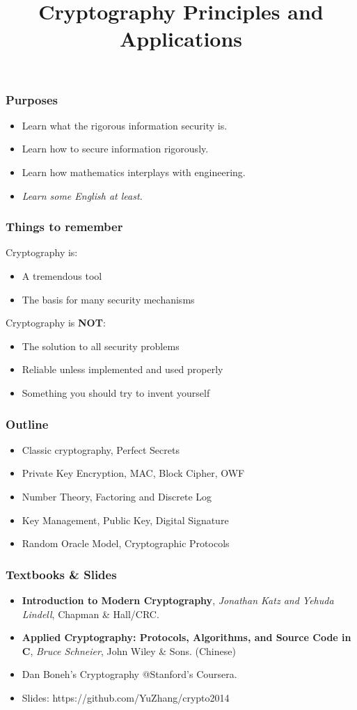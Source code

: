 

\title{Cryptography Principles and Applications}


\maketitle
\begin{frame}\frametitle{Purposes}
\begin{itemize}
\item Learn what the rigorous information security is.
\item Learn how to secure information rigorously.
\item Learn how mathematics interplays with engineering.
\item \emph{Learn some English at least.}
\end{itemize}
\end{frame}
\begin{frame}\frametitle{Things to remember}
Cryptography is:
\begin{itemize}
\item A tremendous tool
\item The basis for many security mechanisms
\end{itemize}
Cryptography is \textbf{NOT}:
\begin{itemize}
\item The solution to all security problems
\item Reliable unless implemented and used properly
\item Something you should try to invent yourself	
\end{itemize}
\end{frame}
\begin{frame}\frametitle{Outline}
\begin{itemize}
\item Classic cryptography, Perfect Secrets
\item Private Key Encryption, MAC, Block Cipher, OWF
\item Number Theory, Factoring and Discrete Log
\item Key Management, Public Key, Digital Signature
\item Random Oracle Model, Cryptographic Protocols
\end{itemize}	
\end{frame}
\begin{frame}\frametitle{Textbooks \& Slides}
\begin{itemize}
\item \textbf{Introduction to Modern Cryptography}, \emph{Jonathan Katz and Yehuda Lindell}, Chapman \& Hall/CRC.
\item \textbf{Applied Cryptography: Protocols, Algorithms, and Source Code in C}, \emph{Bruce Schneier}, John Wiley \& Sons. (Chinese)
\item Dan Boneh's Cryptography @Stanford's Coursera.
\item Slides: https://github.com/YuZhang/crypto2014
\end{itemize}
\end{frame}
